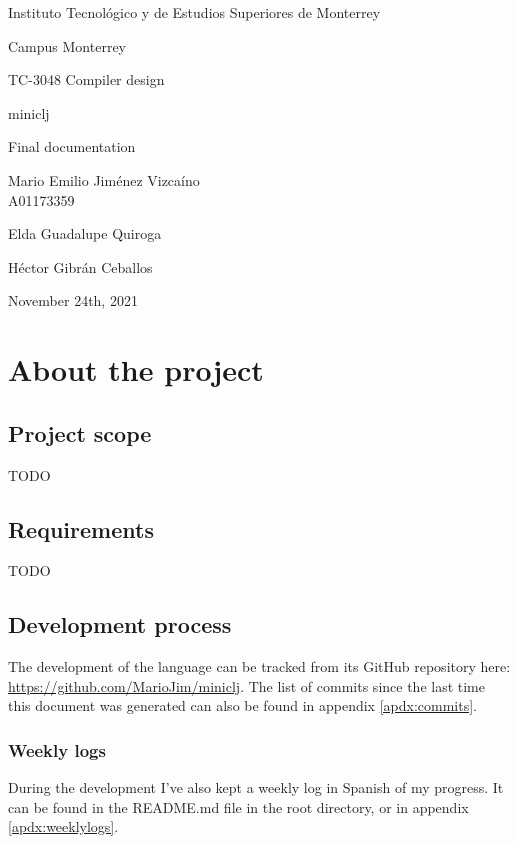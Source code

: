 \documentclass[11pt]{scrreprt}
\begin{document}
\begin{titlepage}
    \centering
    \vspace{4\baselineskip}
    Instituto Tecnológico y de Estudios Superiores de Monterrey\par
    Campus Monterrey\par
    \vspace{2\baselineskip}
    {\large
    TC-3048 Compiler design}\par
    \vspace{6\baselineskip}
    {\huge
    miniclj\par}
    {\LARGE
    Final documentation\par}
    \vspace{4\baselineskip}
    {\Large
    Mario Emilio Jiménez Vizcaíno\\ A01173359\par}
    \vfill
    Elda Guadalupe Quiroga\par
    Héctor Gibrán Ceballos\par
    \vspace{4\baselineskip}
    November 24th, 2021
\end{titlepage}

\pagebreak

\tableofcontents

\chapter{About the project}
\section{Project scope}
TODO

\section{Requirements}
TODO

\section{Development process}
The development of the language can be tracked from its GitHub repository here: \\\url{https://github.com/MarioJim/miniclj}. The list of commits since the last time this document was generated can also be found in appendix \ref{apdx:commits}.

\subsection{Weekly logs}
During the development I've also kept a weekly log in Spanish of my progress. It can be found in the README.md file in the root directory, or in appendix \ref{apdx:weeklylogs}.
\end{document}
